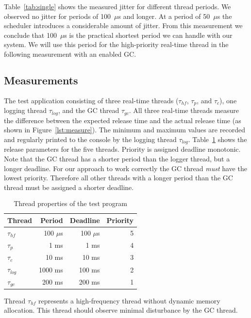 Table~\ref{tab:single} shows the measured jitter for different
thread periods. We observed no jitter for periods of 100~$\mu$s and
longer. At a period of 50~$\mu$s the scheduler introduces a
considerable amount of jitter. From this measurement we conclude
that 100~$\mu$s is the practical shortest period we can handle with
our system. We will use this period for the high-priority real-time
thread in the following measurement with an enabled GC.

\subsection{Measurements}

The test application consisting of three real-time threads
($\tau_{hf}$, $\tau_{p}$, and $\tau_{c}$), one logging thread
$\tau_{log}$, and the GC thread $\tau_{gc}$. All three real-time
threads measure the difference between the expected release time and
the actual release time (as shown in Figure~\ref{lst:measure}). The
minimum and maximum values are recorded and regularly printed to the
console by the logging thread $\tau_{log}$. Table~\ref{tab:exp}
shows the release parameters for the five threads. Priority is
assigned deadline monotonic. Note that the GC thread has a shorter
period than the logger thread, but a longer deadline. For our
approach to work correctly the GC thread \emph{must} have the lowest
priority. Therefore all other threads with a longer period than the
GC thread must be assigned a shorter deadline.

\begin{table}
    \centering
    \begin{tabular}{lrrr}
    \toprule
    Thread & Period & Deadline & Priority \\
    \midrule
    $\tau_{hf}$ & 100 $\mu$s & 100 $\mu$s & 5 \\
    $\tau_{p}$ &  1 ms & 1 ms & 4 \\
    $\tau_{c}$ & 10 ms & 10 ms & 3 \\
    $\tau_{log}$ & 1000 ms & 100 ms & 2 \\
    $\tau_{gc}$ & 200 ms & 200 ms & 1 \\
    \bottomrule
    \end{tabular}
    \caption{Thread properties of the test program}
    \label{tab:exp}
\end{table}

Thread $\tau_{hf}$ represents a high-frequency thread without
dynamic memory allocation. This thread should observe minimal
disturbance by the GC thread.

